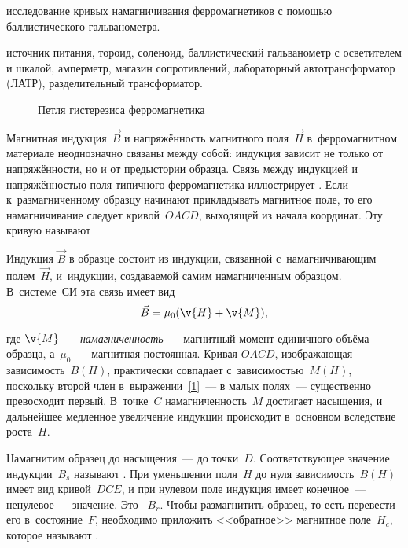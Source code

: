 
\begin{lab:aim}
	исследование кривых намагничивания ферромагнетиков с помощью баллистического гальванометра.
\end{lab:aim}

\begin{lab:equipment}
	источник питания, тороид, соленоид, баллистический гальванометр с осветителем и шкалой, 
	амперметр, магазин сопротивлений, лабораторный автотрансформатор (ЛАТР), разделительный трансформатор.
\end{lab:equipment}


\begin{wrapfigure}{r}{0.4\textwidth}
	\caption{Петля гистерезиса ферромагнетика}
\end{wrapfigure}


Магнитная индукция~$\vec{B}$ и напряжённость магнитного поля~$\vec{H}$ в~ферромагнитном материале неоднозначно связаны между
собой: индукция зависит не только от напряжённости, но и от предыстории образца. Связь между индукцией и напряжённостью
поля типичного ферромагнетика иллюстрирует . Если к~размагниченному образцу начинают прикладывать магнитное поле,
то его намагничивание следует кривой~$OACD$, выходящей из начала координат. Эту кривую называют 

Индукция $\vec{B}$ в образце состоит из индукции, связанной с~намагничивающим полем~$\vec{H}$, и~индукции, создаваемой самим
намагниченным образцом. В~системе~СИ эта связь имеет вид
\begin{equation}
	\eqmark{1}
	\vec{B}=\mu_0(\v{H}+\v{M}),
\end{equation}

где $\v{M}$~--- \emph{намагниченность}~--- магнитный момент единичного объёма образца, а~$\mu_0$~--- магнитная
постоянная. Кривая $OACD$, изображающая зависимость~$B(H)$, практически совпадает с~зависимостью~$M(H)$, поскольку
второй член в~выражении~\eqref{1}~--- в малых полях~--- существенно превосходит первый. В~точке~$C$ намагниченность~$M$
достигает насыщения, и дальнейшее медленное увеличение индукции происходит в~основном вследствие роста~$H$.

Намагнитим образец до насыщения~--- до точки~$D$. Соответствующее значение индукции~$B_s$ называют . При уменьшении поля~$H$ до нуля зависимость~$B(H)$ имеет вид кривой~$DCE$, и при нулевом поле индукция имеет
конечное~--- ненулевое --- значение. Это ~$B_r$. Чтобы размагнитить образец, то есть перевести
его в~состояние~$F$, необходимо приложить <<обратное>> магнитное поле~$H_c$, которое называют .


